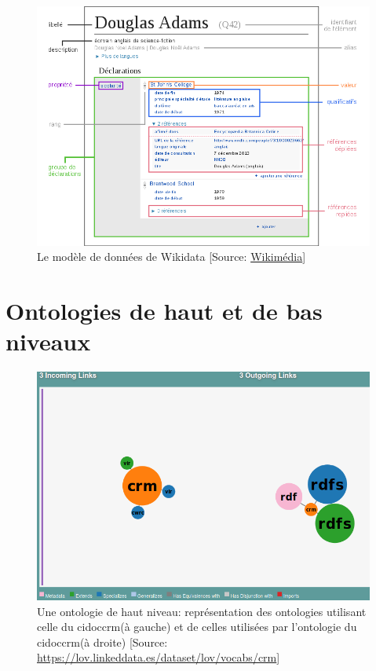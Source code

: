 \begin{figure}[!h]
	\centering
	\includegraphics[width=16cm]{images/modele_wikidata.png}
	\caption[Le modèle de données de Wikidata]{Le modèle de données de Wikidata [Source: \href{https://upload.wikimedia.org/wikipedia/commons/thumb/c/ce/Datamodel_in_Wikidata_fr.svg/330px-Datamodel_in_Wikidata_fr.svg.png}{Wikimédia}]}
	\label{wikidata}
\end{figure}

\chapter{\label{annexe_onto}Ontologies de haut et de bas niveaux}

\begin{figure}[!h]
	\centering
	\includegraphics[width=14cm]{images/onto_crm.png}
	\caption[Une ontologie de haut niveau: CIDOC-CRM]{Une ontologie de haut niveau: représentation des ontologies utilisant celle du \ac{cidoccrm}(à gauche) et de celles utilisées par l'ontologie du \ac{cidoccrm}(à droite) [Source: \url{https://lov.linkeddata.es/dataset/lov/vocabs/crm}]}
	\label{onto_crm}
\end{figure}

